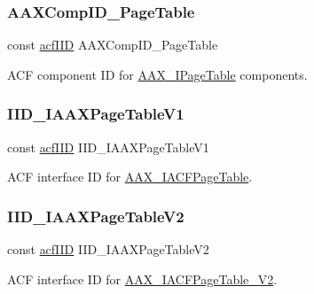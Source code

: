 \mbox{\label{a00683_ab7a7eb58fd2e7fb243dd7deaf9416faa}} 
\subsubsection{\texorpdfstring{AAXCompID\_PageTable}{AAXCompID\_PageTable}}
{\footnotesize\ttfamily const \mbox{\hyperlink{a00269_a59df0b41744eee7a066787aaedf97f67}{acf\+I\+ID}} A\+A\+X\+Comp\+I\+D\+\_\+\+Page\+Table}



A\+CF component ID for \mbox{\hyperlink{a01849}{A\+A\+X\+\_\+\+I\+Page\+Table}} components. 

\mbox{\label{a00683_a04d4f5570116d51b5ac4b0d4f660e7ea}} 
\subsubsection{\texorpdfstring{IID\_IAAXPageTableV1}{IID\_IAAXPageTableV1}}
{\footnotesize\ttfamily const \mbox{\hyperlink{a00269_a59df0b41744eee7a066787aaedf97f67}{acf\+I\+ID}} I\+I\+D\+\_\+\+I\+A\+A\+X\+Page\+Table\+V1}



A\+CF interface ID for \mbox{\hyperlink{a01725}{A\+A\+X\+\_\+\+I\+A\+C\+F\+Page\+Table}}. 

\mbox{\label{a00683_a028bd21ca7e74fcb2dc4587219be8721}} 
\subsubsection{\texorpdfstring{IID\_IAAXPageTableV2}{IID\_IAAXPageTableV2}}
{\footnotesize\ttfamily const \mbox{\hyperlink{a00269_a59df0b41744eee7a066787aaedf97f67}{acf\+I\+ID}} I\+I\+D\+\_\+\+I\+A\+A\+X\+Page\+Table\+V2}



A\+CF interface ID for \mbox{\hyperlink{a01729}{A\+A\+X\+\_\+\+I\+A\+C\+F\+Page\+Table\+\_\+\+V2}}. 

